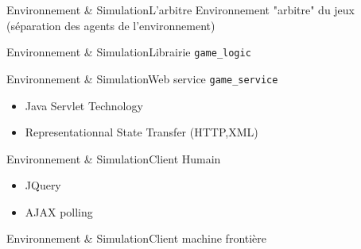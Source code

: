 \begin{frame}{Environnement \& Simulation}{L'arbitre}
Environnement "arbitre" du jeux (séparation des agents de l'environnement)
\end{frame}

\begin{frame}{Environnement \& Simulation}{Librairie \texttt{game\_logic}}

\end{frame}

\begin{frame}{Environnement \& Simulation}{Web service \texttt{game\_service}}
\begin{itemize}
\item Java Servlet Technology
\item Representationnal State Transfer (HTTP,XML)
\end{itemize}
\end{frame}

\begin{frame}{Environnement \& Simulation}{Client Humain}
\begin{itemize}
\item JQuery
\item AJAX polling
\end{itemize}
\end{frame}

\begin{frame}{Environnement \& Simulation}{Client machine frontière}

\end{frame}


